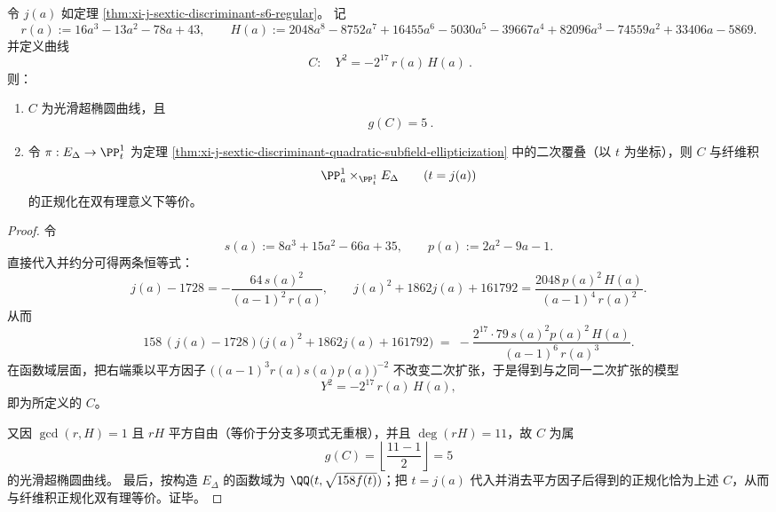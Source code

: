 


\begin{theorem}\label{thm:xi-j-sextic-fiber-product-genus5-hyperelliptic-model}
令 \(j(a)\) 如定理 \ref{thm:xi-j-sextic-discriminant-s6-regular}。
记
\[
r(a):=16a^3-13a^2-78a+43,
\qquad
H(a):=2048a^8-8752a^7+16455a^6-5030a^5-39667a^4+82096a^3-74559a^2+33406a-5869.
\]
并定义曲线
\[
\boxed{\ C:\quad Y^2=-2^{17}\,r(a)\,H(a)\ }.
\]
则：
\begin{enumerate}
  \item \(C\) 为光滑超椭圆曲线，且
  \[
  \boxed{\ g(C)=5\ }.
  \]
  \item 令 \(\pi:E_\Delta\to\PP^1_t\) 为定理 \ref{thm:xi-j-sextic-discriminant-quadratic-subfield-ellipticization} 中的二次覆叠（以 \(t\) 为坐标），则 \(C\) 与纤维积
  \[
  \PP^1_a\times_{\PP^1_t}E_\Delta
  \qquad(t=j(a))
  \]
  的正规化在双有理意义下等价。
\end{enumerate}
\end{theorem}
\begin{proof}
令
\[
s(a):=8a^3+15a^2-66a+35,\qquad p(a):=2a^2-9a-1.
\]
直接代入并约分可得两条恒等式：
\[
j(a)-1728=-\frac{64\,s(a)^2}{(a-1)^2\,r(a)},
\qquad
j(a)^2+1862j(a)+161792=\frac{2048\,p(a)^2\,H(a)}{(a-1)^4\,r(a)^2}.
\]
从而
\[
158\,(j(a)-1728)\bigl(j(a)^2+1862j(a)+161792\bigr)
\;=\;
-\frac{2^{17}\cdot 79\, s(a)^2p(a)^2\,H(a)}{(a-1)^6\,r(a)^3}.
\]
在函数域层面，把右端乘以平方因子 \(\bigl((a-1)^3r(a)s(a)p(a)\bigr)^{-2}\) 不改变二次扩张，于是得到与之同一二次扩张的模型
\[
Y^2=-2^{17}\,r(a)\,H(a),
\]
即为所定义的 \(C\)。
\par
又因 \(\gcd(r,H)=1\) 且 \(rH\) 平方自由（等价于分支多项式无重根），并且 \(\deg(rH)=11\)，故 \(C\) 为属
\[
g(C)=\left\lfloor\frac{11-1}{2}\right\rfloor=5
\]
的光滑超椭圆曲线。
最后，按构造 \(E_\Delta\) 的函数域为 \(\QQ(t,\sqrt{158f(t)})\)；把 \(t=j(a)\) 代入并消去平方因子后得到的正规化恰为上述 \(C\)，从而与纤维积正规化双有理等价。证毕。
\end{proof}

